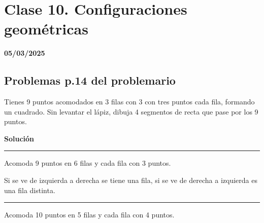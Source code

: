 \chapter{Clase 10. Configuraciones geométricas}
\textbf{05/03/2025}

\section{Problemas p.14 del problemario}


\begin{minipage}[t]{0.48\textwidth}
    \noindent
    \begin{excercise}
        Tienes 9 puntos acomodados en 3 filas con 3 con tres puntos cada fila, formando un cuadrado. Sin levantar el lápiz, dibuja 4 segmentos de recta que pase por los 9 puntos.
    \end{excercise}
\end{minipage}
\begin{minipage}[t]{0.48\textwidth}
    \begin{center}
        \textbf{Solución}
    \end{center}
    \begin{center}
        
    \end{center}
\end{minipage}
\par

\bigskip
\noindent\hrule
\bigskip

\par
\begin{minipage}[t]{0.48\textwidth}
    \bigskip \bigskip
    \begin{excercise}
        Acomoda 9 puntos en 6 filas y cada fila con 3 puntos.
    \end{excercise}
\end{minipage}
\begin{minipage}[t]{0.48\textwidth}
    \noindent
    \begin{center}
        
    \end{center}
    Si se ve de izquierda a derecha se tiene una fila, si se ve de derecha a izquierda es una fila distinta.
\end{minipage}
\par

\bigskip
\noindent\hrule
\bigskip

\par
\begin{minipage}[t]{0.48\textwidth}
    \begin{excercise}
        Acomoda 10 puntos en 5 filas y cada fila con 4 puntos.
    \end{excercise}
\end{minipage}
\begin{minipage}[t]{0.48\textwidth}
    \noindent
    \begin{center}
        
    \end{center}
\end{minipage}
